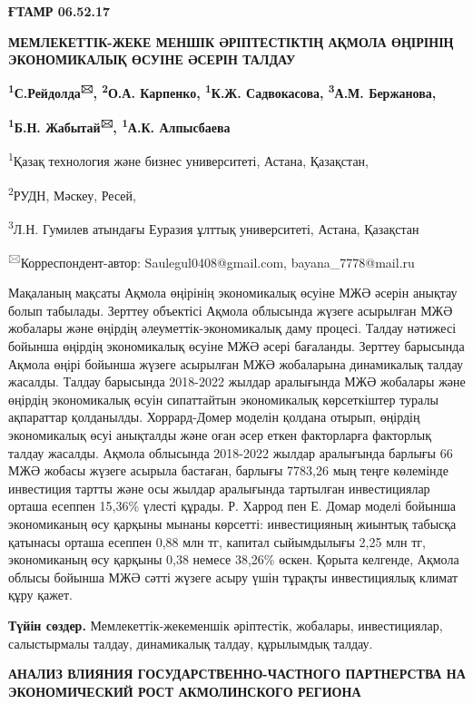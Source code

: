 




\newpage
{\bfseries ҒТАМР 06.52.17}

{\bfseries МЕМЛЕКЕТТІК-ЖЕКЕ МЕНШІК ӘРІПТЕСТІКТІҢ АҚМОЛА ӨҢІРІНІҢ
ЭКОНОМИКАЛЫҚ ӨСУІНЕ ӘСЕРІН ТАЛДАУ}

{\bfseries \textsuperscript{1}С.Рейдолда\textsuperscript{🖂},
\textsuperscript{2}О.А. Карпенко, \textsuperscript{1}К.Ж. Садвокасова,
\textsuperscript{3}А.М. Бержанова,}

{\bfseries \textsuperscript{1}Б.Н. Жабытай\textsuperscript{🖂},
\textsuperscript{1}А.К. Алпысбаева}

\textsuperscript{1}Қазақ технология және бизнес университеті, Астана,
Қазақстан,

\textsuperscript{2}РУДН, Мәскеу, Ресей,

\textsuperscript{3}Л.Н. Гумилев атындағы Еуразия ұлттық университеті,
Астана, Қазақстан

\textsuperscript{🖂}Корреспондент-автор: Saulegul0408@gmail.com,
bayana\_7778@mail.ru

Мақаланың мақсаты Ақмола өңірінің экономикалық өсуіне МЖӘ әсерін анықтау
болып табылады. Зерттеу объектісі Ақмола облысында жүзеге асырылған МЖӘ
жобалары және өңірдің әлеуметтік-экономикалық даму процесі. Талдау
нәтижесі бойынша өңірдің экономикалық өсуіне МЖӘ әсері бағаланды.
Зерттеу барысында Ақмола өңірі бойынша жүзеге асырылған МЖӘ жобаларына
динамикалық талдау жасалды. Талдау барысында 2018-2022 жылдар аралығында
МЖӘ жобалары және өңірдің экономикалық өсуін сипаттайтын экономикалық
көрсеткіштер туралы ақпараттар қолданылды. Хоррард-Домер моделін қолдана
отырып, өңірдің экономикалық өсуі анықталды және оған әсер еткен
факторларға факторлық талдау жасалды. Ақмола облысында 2018-2022 жылдар
аралығында барлығы 66 МЖӘ жобасы жүзеге асырыла бастаған, барлығы
7783,26 мың теңге көлемінде инвестиция тартты және осы жылдар аралығында
тартылған инвестициялар орташа есеппен 15,36\% үлесті құрады. Р. Харрод
пен Е. Домар моделі бойынша экономиканың өсу қарқыны мынаны көрсетті:
инвестицияның жиынтық табысқа қатынасы орташа есеппен 0,88 млн тг,
капитал сыйымдылығы 2,25 млн тг, экономиканың өсу қарқыны 0,38 немесе
38,26\% өскен. Қорыта келгенде, Ақмола облысы бойынша МЖӘ сәтті жүзеге
асыру үшін тұрақты инвестициялық климат құру қажет.

{\bfseries Түйін сөздер.} Мемлекеттік-жекеменшік әріптестік, жобалары,
инвестициялар, салыстырмалы талдау, динамикалық талдау, құрылымдық
талдау.

{\bfseries АНАЛИЗ ВЛИЯНИЯ ГОСУДАРСТВЕННО-ЧАСТНОГО ПАРТНЕРСТВА НА
ЭКОНОМИЧЕСКИЙ РОСТ АКМОЛИНСКОГО РЕГИОНА}


